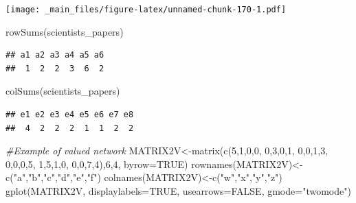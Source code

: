 \documentclass[
  notitlepage,
  onecolumn,
  openany]{book}
\newenvironment{Shaded}{\begin{snugshade}}{\end{snugshade}}
\newcommand{\AttributeTok}[1]{\textcolor[rgb]{0.77,0.63,0.00}{#1}}
\newcommand{\CommentTok}[1]{\textcolor[rgb]{0.56,0.35,0.01}{\textit{#1}}}
\newcommand{\ConstantTok}[1]{\textcolor[rgb]{0.00,0.00,0.00}{#1}}
\newcommand{\DecValTok}[1]{\textcolor[rgb]{0.00,0.00,0.81}{#1}}
\newcommand{\FunctionTok}[1]{\textcolor[rgb]{0.00,0.00,0.00}{#1}}
\newcommand{\NormalTok}[1]{#1}
\newcommand{\OtherTok}[1]{\textcolor[rgb]{0.56,0.35,0.01}{#1}}
\newcommand{\StringTok}[1]{\textcolor[rgb]{0.31,0.60,0.02}{#1}}
\begin{document}
\texttt{[image: \_main\_files/figure-latex/unnamed-chunk-170-1.pdf]}

\begin{Shaded}
\begin{Highlighting}[]
\FunctionTok{rowSums}\NormalTok{(scientists\_papers)}
\end{Highlighting}
\end{Shaded}

\begin{verbatim}
## a1 a2 a3 a4 a5 a6 
##  1  2  2  3  6  2
\end{verbatim}

\begin{Shaded}
\begin{Highlighting}[]
\FunctionTok{colSums}\NormalTok{(scientists\_papers)}
\end{Highlighting}
\end{Shaded}

\begin{verbatim}
## e1 e2 e3 e4 e5 e6 e7 e8 
##  4  2  2  2  1  1  2  2
\end{verbatim}

\begin{Shaded}
\begin{Highlighting}[]
\CommentTok{\#Example of valued network}
\NormalTok{MATRIX2V}\OtherTok{\textless{}{-}}\FunctionTok{matrix}\NormalTok{(}\FunctionTok{c}\NormalTok{(}\DecValTok{5}\NormalTok{,}\DecValTok{1}\NormalTok{,}\DecValTok{0}\NormalTok{,}\DecValTok{0}\NormalTok{,}
                   \DecValTok{0}\NormalTok{,}\DecValTok{3}\NormalTok{,}\DecValTok{0}\NormalTok{,}\DecValTok{1}\NormalTok{,}
                   \DecValTok{0}\NormalTok{,}\DecValTok{0}\NormalTok{,}\DecValTok{1}\NormalTok{,}\DecValTok{3}\NormalTok{,}
                   \DecValTok{0}\NormalTok{,}\DecValTok{0}\NormalTok{,}\DecValTok{0}\NormalTok{,}\DecValTok{5}\NormalTok{,}
                   \DecValTok{1}\NormalTok{,}\DecValTok{5}\NormalTok{,}\DecValTok{1}\NormalTok{,}\DecValTok{0}\NormalTok{,}
                   \DecValTok{0}\NormalTok{,}\DecValTok{0}\NormalTok{,}\DecValTok{7}\NormalTok{,}\DecValTok{4}\NormalTok{),}\DecValTok{6}\NormalTok{,}\DecValTok{4}\NormalTok{, }\AttributeTok{byrow=}\ConstantTok{TRUE}\NormalTok{)}
\FunctionTok{rownames}\NormalTok{(MATRIX2V)}\OtherTok{\textless{}{-}}\FunctionTok{c}\NormalTok{(}\StringTok{"a"}\NormalTok{,}\StringTok{"b"}\NormalTok{,}\StringTok{"c"}\NormalTok{,}\StringTok{"d"}\NormalTok{,}\StringTok{"e"}\NormalTok{,}\StringTok{"f"}\NormalTok{)}
\FunctionTok{colnames}\NormalTok{(MATRIX2V)}\OtherTok{\textless{}{-}}\FunctionTok{c}\NormalTok{(}\StringTok{"w"}\NormalTok{,}\StringTok{"x"}\NormalTok{,}\StringTok{"y"}\NormalTok{,}\StringTok{"z"}\NormalTok{)}
\FunctionTok{gplot}\NormalTok{(MATRIX2V, }\AttributeTok{displaylabels=}\ConstantTok{TRUE}\NormalTok{, }
      \AttributeTok{usearrows=}\ConstantTok{FALSE}\NormalTok{, }\AttributeTok{gmode=}\StringTok{"twomode"}\NormalTok{)}
\end{Highlighting}
\end{Shaded}
\end{document}
